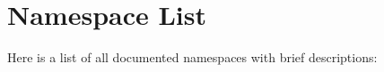 \section{Namespace List}
Here is a list of all documented namespaces with brief descriptions\+:\begin{DoxyCompactList}
\item{}
\end{DoxyCompactList}

